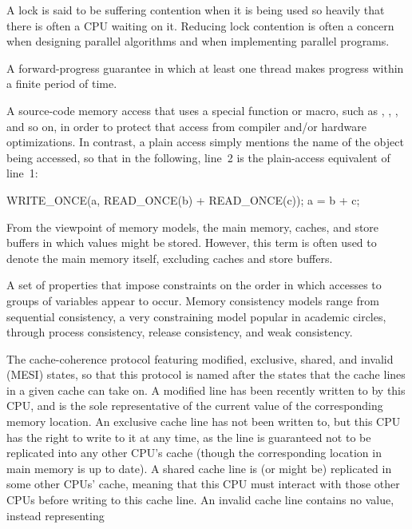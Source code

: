 \begin{description}
	A lock is said to be suffering contention when it is being
	used so heavily that there is often a CPU waiting on it.
	Reducing lock contention is often a concern when designing
	parallel algorithms and when implementing parallel programs.
\item[\IX{Lock Free}:]
	A forward-progress guarantee in which at least one thread makes
	progress within a finite period of time.
\item[\IX{Marked Access}:]
	A source-code memory access that uses a special function or
	macro, such as , ,
	, and so on, in order to protect that access
	from compiler and/or hardware optimizations.
	In contrast, a plain access simply mentions the name of
	the object being accessed, so that in the following, line~2
	is the plain-access equivalent of line~1:
	\begin{VerbatimN}
	WRITE_ONCE(a, READ_ONCE(b) + READ_ONCE(c));
	a = b + c;
	\end{VerbatimN}
\item[\IX{Memory}:]
	From the viewpoint of memory models, the main memory,
	caches, and store buffers in which values might be stored.
	However, this term is often used to denote the main memory
	itself, excluding caches and store buffers.
\item[\IX{Memory Consistency}:]
	A set of properties that impose constraints on the order in
	which accesses to groups of variables appear to occur.
	Memory consistency models range from sequential consistency,
	a very constraining model popular in academic circles, through
	process consistency, release consistency, and weak consistency.
\item[\IXaltr{MESI Protocol}{MESI protocol}:]
	The
	cache-coherence protocol featuring
	modified, exclusive, shared, and invalid (MESI) states,
	so that this protocol is named after the states that the
	cache lines in a given cache can take on.
	A modified line has been recently written to by this CPU,
	and is the sole representative of the current value of
	the corresponding memory location.
	An exclusive cache line has not been written to, but this
	CPU has the right to write to it at any time, as the line
	is guaranteed not to be replicated into any other CPU's cache
	(though the corresponding location in main memory is up to date).
	A shared cache line is (or might be) replicated in some other
	CPUs' cache, meaning that this CPU must interact with those other
	CPUs before writing to this cache line.
	An invalid cache line contains no value, instead representing

\end{description}
